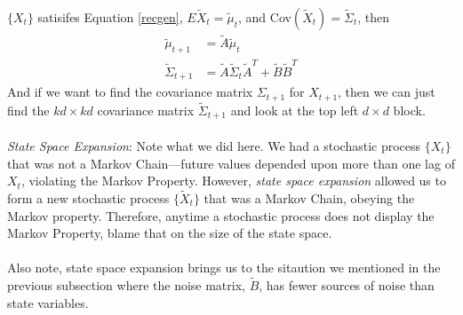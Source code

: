 \documentclass[12pt]{article}
\theoremstyle{plain}
\theoremstyle{definition}
\theoremstyle{remark}
\begin{document}
$\{{X}_t\}$ satisifes Equation \ref{recgen},
$E\tilde{{X}}_t = \tilde{\mu}_t$, and
Cov$(\tilde{{X}}_t) = \tilde{\Sigma}_t$, then
\begin{align*}
    \tilde{\mu}_{t+1} &= \tilde{A}\tilde{\mu}_t \\
    \tilde{\Sigma}_{t+1} &= \tilde{A} \tilde{\Sigma}_t\tilde{A}^T +
	\tilde{B} \tilde{B}^T
\end{align*}
And if we want to find the covariance matrix $\Sigma_{t+1}$ for
${X}_{t+1}$, then we can just find the $kd \times kd$
covariance matrix $\tilde{\Sigma}_{t+1}$ and look at the top left
$d\times d$ block.
\\
\\
{\sl State Space Expansion}: Note what we did here.  We had a
stochastic process $\{{X}_{t}\}$ that was not a Markov
Chain---future values depended upon more than one lag of
${X}_t$, violating the Markov Property.  However,
\emph{state space expansion} allowed us to form a new stochastic
process $\{\tilde{{X}}_t\}$ that was a Markov Chain, obeying
the Markov property.  Therefore, anytime a stochastic process
does not display the Markov Property, blame that on the size of
the state space.
\\
\\
Also note, state space expansion brings us to the sitaution we
mentioned in the previous subsection where the noise matrix,
$\tilde{B}$, has fewer sources of noise than state variables.


\clearpage
\end{document}
